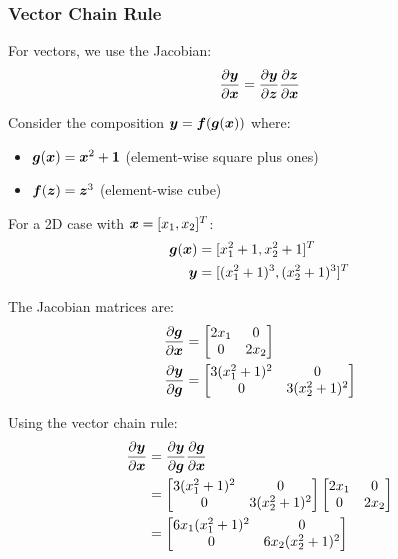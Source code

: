 \subsubsection{Vector Chain Rule}

For vectors, we use the Jacobian:
\begin{equation}
\frac{\partial \boldsymbol{y}}{\partial \boldsymbol{x}} = \frac{\partial \boldsymbol{y}}{\partial \boldsymbol{z}} \frac{\partial \boldsymbol{z}}{\partial \boldsymbol{x}}
\end{equation}

\begin{example}
Consider the composition $\boldsymbol{y} = \boldsymbol{f}(\boldsymbol{g}(\boldsymbol{x}))$ where:
\begin{itemize}
    \item $\boldsymbol{g}(\boldsymbol{x}) = \boldsymbol{x}^2 + \boldsymbol{1}$ (element-wise square plus ones)
    \item $\boldsymbol{f}(\boldsymbol{z}) = \boldsymbol{z}^3$ (element-wise cube)
\end{itemize}

For a 2D case with $\boldsymbol{x} = [x_1, x_2]^T$:
\begin{align}
\boldsymbol{g}(\boldsymbol{x}) &= [x_1^2 + 1, x_2^2 + 1]^T \\
\boldsymbol{y} &= [(x_1^2 + 1)^3, (x_2^2 + 1)^3]^T
\end{align}

The Jacobian matrices are:
\begin{align}
\frac{\partial \boldsymbol{g}}{\partial \boldsymbol{x}} &= \begin{bmatrix} 2x_1 & 0 \\ 0 & 2x_2 \end{bmatrix} \\
\frac{\partial \boldsymbol{y}}{\partial \boldsymbol{g}} &= \begin{bmatrix} 3(x_1^2 + 1)^2 & 0 \\ 0 & 3(x_2^2 + 1)^2 \end{bmatrix}
\end{align}

Using the vector chain rule:
\begin{align}
\frac{\partial \boldsymbol{y}}{\partial \boldsymbol{x}} &= \frac{\partial \boldsymbol{y}}{\partial \boldsymbol{g}} \frac{\partial \boldsymbol{g}}{\partial \boldsymbol{x}} \\
&= \begin{bmatrix} 3(x_1^2 + 1)^2 & 0 \\ 0 & 3(x_2^2 + 1)^2 \end{bmatrix} \begin{bmatrix} 2x_1 & 0 \\ 0 & 2x_2 \end{bmatrix} \\
&= \begin{bmatrix} 6x_1(x_1^2 + 1)^2 & 0 \\ 0 & 6x_2(x_2^2 + 1)^2 \end{bmatrix}
\end{align}
\end{example}

